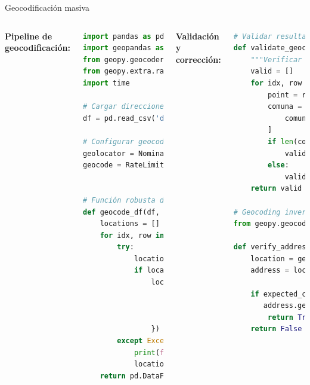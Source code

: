 \documentclass[10pt,aspectratio=169]{beamer}
\begin{document}
\begin{frame}[fragile]{Geocodificación masiva}
    \begin{columns}[T]
        \textbf{Pipeline de geocodificación:}
        \begin{lstlisting}[language=Python]
import pandas as pd
import geopandas as gpd
from geopy.geocoders import Nominatim
from geopy.extra.rate_limiter import RateLimiter
import time

# Cargar direcciones
df = pd.read_csv('direcciones.csv')

# Configurar geocoder con rate limiting
geolocator = Nominatim(user_agent="myapp")
geocode = RateLimiter(geolocator.geocode, 
                      min_delay_seconds=1)

# Función robusta de geocodificación
def geocode_df(df, address_col):
    locations = []
    for idx, row in df.iterrows():
        try:
            location = geocode(row[address_col])
            if location:
                locations.append({
                    'lat': location.latitude,
                    'lon': location.longitude,
                    'address': row[address_col]
                })
        except Exception as e:
            print(f"Error en {row[address_col]}: {e}")
            locations.append({'lat': None, 'lon': None})
    return pd.DataFrame(locations)
        \end{lstlisting}
        
        \textbf{Validación y corrección:}
        \begin{lstlisting}[language=Python]
# Validar resultados
def validate_geocoding(gdf, comuna_bounds):
    """Verificar que puntos estén en comuna"""
    valid = []
    for idx, row in gdf.iterrows():
        point = row.geometry
        comuna = comuna_bounds[
            comuna_bounds.contains(point)
        ]
        if len(comuna) > 0:
            valid.append(True)
        else:
            valid.append(False)
    return valid

# Geocoding inverso para verificar
from geopy.geocoders import reverse

def verify_address(lat, lon, expected_comuna):
    location = geolocator.reverse(f"{lat}, {lon}")
    address = location.raw['address']
    
    if expected_comuna.lower() in 
       address.get('city', '').lower():
        return True
    return False
        \end{lstlisting}
    \end{columns}
\end{frame}
\end{document}
